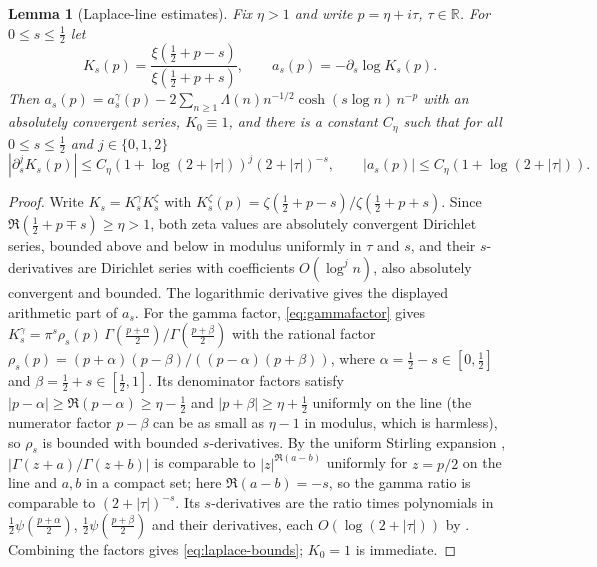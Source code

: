 \documentclass[11pt]{article}
\numberwithin{equation}{section}
\newtheorem{lemma}[theorem]{Lemma}
\theoremstyle{definition}
\theoremstyle{remark}
\newcommand{\RR}{\mathbb R}
\begin{document}
\begin{lemma}[Laplace-line estimates]\label{lem:laplace}
Fix $\eta>1$ and write $p=\eta+i\tau$, $\tau\in\RR$. For $0\le s\le\tfrac12$ let
\[
 K_s(p)=\frac{\xi(\tfrac12+p-s)}{\xi(\tfrac12+p+s)},\qquad
 a_s(p)=-\partial_s\log K_s(p).
\]
Then $a_s(p)=a^\gamma_s(p)-2\sum_{n\ge1}\Lambda(n)n^{-1/2}\cosh(s\log n)\,n^{-p}$
with an absolutely convergent series, $K_0\equiv1$, and there is a constant
$C_\eta$ such that for all $0\le s\le\tfrac12$ and $j\in\{0,1,2\}$
\begin{equation}\label{eq:laplace-bounds}
 |\partial_s^jK_s(p)|\le C_\eta(1+\log(2+|\tau|))^j(2+|\tau|)^{-s},
 \qquad |a_s(p)|\le C_\eta(1+\log(2+|\tau|)).
\end{equation}
\end{lemma}
\begin{proof}
Write $K_s=K^\gamma_sK^\zeta_s$ with
$K^\zeta_s(p)=\zeta(\tfrac12+p-s)/\zeta(\tfrac12+p+s)$. Since
$\Re(\tfrac12+p\mp s)\ge\eta>1$, both zeta values are absolutely convergent
Dirichlet series, bounded above and below in modulus uniformly in $\tau$ and
$s$, and their $s$-derivatives are Dirichlet series with coefficients
$O(\log^jn)$, also absolutely convergent and bounded. The logarithmic
derivative gives the displayed arithmetic part of $a_s$. For the gamma factor,
\eqref{eq:gammafactor} gives $K^\gamma_s=\pi^s\rho_s(p)\,
\Gamma(\tfrac{p+\alpha}2)/\Gamma(\tfrac{p+\beta}2)$ with the rational factor
$\rho_s(p)=(p+\alpha)(p-\beta)/((p-\alpha)(p+\beta))$, where
$\alpha=\tfrac12-s\in[0,\tfrac12]$ and $\beta=\tfrac12+s\in[\tfrac12,1]$. Its
denominator factors satisfy $|p-\alpha|\ge\Re(p-\alpha)\ge\eta-\tfrac12$ and
$|p+\beta|\ge\eta+\tfrac12$ uniformly on the line (the numerator factor
$p-\beta$ can be as small as $\eta-1$ in modulus, which is harmless), so
$\rho_s$ is bounded with bounded $s$-derivatives. By the
uniform Stirling expansion \cite[\S5.11(iii)]{DLMF},
$|\Gamma(z+a)/\Gamma(z+b)|$ is comparable to $|z|^{\Re(a-b)}$ uniformly for
$z=p/2$ on the line and $a,b$ in a compact set; here $\Re(a-b)=-s$, so the
gamma ratio is comparable to $(2+|\tau|)^{-s}$. Its $s$-derivatives are the
ratio times polynomials in $\tfrac12\psi(\tfrac{p+\alpha}2)$,
$\tfrac12\psi(\tfrac{p+\beta}2)$ and their derivatives, each
$O(\log(2+|\tau|))$ by \cite[\S5.11(i)]{DLMF}. Combining the factors gives
\eqref{eq:laplace-bounds}; $K_0=1$ is immediate.
\end{proof}
\end{document}
